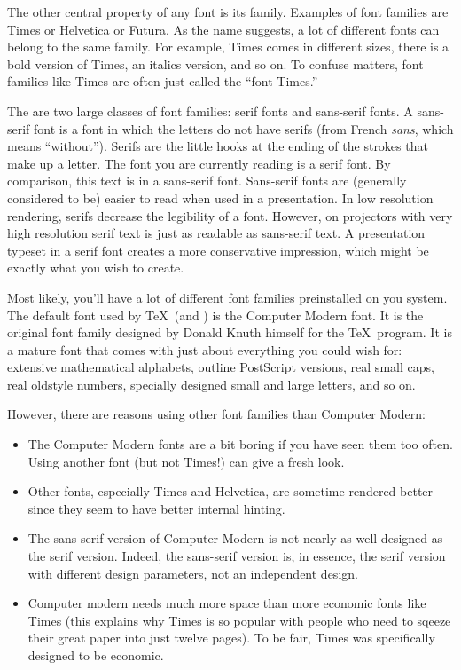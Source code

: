 The other central property of any font is its family. Examples of font
families are Times or Helvetica or Futura. As the name suggests, a lot
of different fonts can belong to the same family. For example, Times
comes in different sizes, there is a bold version of Times, an
italics version, and so on. To confuse matters, font families like
Times are often just called the ``font Times.''

The are two large classes of font families: serif fonts and
sans-serif fonts. A sans-serif font is a font in
which the letters do not have serifs (from French \emph{sans}, which
means ``without''). Serifs are the little hooks at the ending of the
strokes that make up a letter. The font you are currently reading is a
serif font. \textsf{By comparison, this text is in a sans-serif font.}
Sans-serif fonts are (generally considered to be) easier to read
when used in a presentation. In low resolution rendering, serifs
decrease the legibility of a font. However, on projectors with very
high resolution serif text is just as readable as sans-serif text. A
presentation typeset in a serif font creates a more conservative
impression, which might be exactly what you wish to create. 

Most likely, you'll have a lot of different font families preinstalled
on you system. The default font used by \TeX\ (and \beamer) is the
Computer Modern font. It  is the original font family designed by Donald
Knuth himself for the \TeX\ program. It is a mature font that comes
with just about everything you could wish for: extensive mathematical
alphabets, outline PostScript versions, real small caps, real oldstyle
numbers, specially designed small and large letters, and so on.

However, there are reasons using other font families than Computer
Modern: 
\begin{itemize}
\item
  The Computer Modern fonts are a bit boring if you have seen them too
  often. Using another font (but not Times!) can give a fresh look.
\item
  Other fonts, especially Times and Helvetica, are sometime rendered
  better since they seem to have better internal hinting.
\item
  The sans-serif version of Computer Modern is not nearly as
  well-designed as the serif version. Indeed, the sans-serif version
  is, in essence, the serif version with different design parameters,
  not an independent design.
\item
  Computer modern needs much more space than more economic fonts like
  Times (this explains why Times is so popular with people who need
  to sqeeze their great paper into just twelve pages). To be fair,
  Times was specifically designed to be economic.
\end{itemize}

